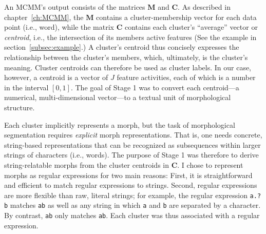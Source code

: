 {%


An MCMM's output consists of 
the matrices $\mathbf{M}$ and $\mathbf{C}$. As described in 
chapter~\ref{ch:MCMM}, the $\mathbf{M}$ contains a cluster-membership 
vector for each data point (i.e., word), while the matrix $\mathbf{C}$ contains 
each cluster's ``average'' vector or \emph{centroid}, i.e., the intersection 
of its members active features (See the example in section~\ref{subsec:example}.)
A cluster's centroid thus concisely expresses the relationship between the cluster's members, which, ultimately, is the cluster's meaning. 
Cluster centroids can therefore be used as cluster labels. In our case, however, a centroid is a vector of $J$ feature activities, each of which is a number in the interval $[0,1]$. 
The goal of Stage 1 was to convert each centroid---a numerical, 
multi-dimensional vector---to a textual unit of morphological structure.

Each cluster implicitly represents a morph, but the task of morphological 
segmentation requires \emph{explicit} morph representations. 
 That is, one needs concrete, string-based representations that can be recognized 
 as subsequences within larger strings of characters (i.e., words). 
The purpose of Stage 1 was therefore to derive string-relatable morphs from the cluster centroids in $\mathbf{C}$.
I chose to represent morphs as regular expressions for two main reasons: First, it is straightforward and efficient to match regular expressions to strings. Second, regular expressions are more flexible than raw, literal strings; for example, the regular expression 
\texttt{a.?b} matches \texttt{ab} as well as any string in which
\texttt{a} and \texttt{b} are separated by a character. By contrast, \texttt{ab} only matches \texttt{ab}.  
Each cluster was thus associated with a regular expression. 

}

